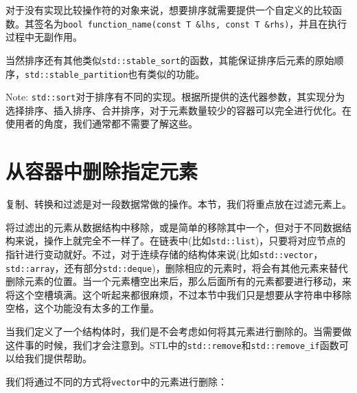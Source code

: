 对于没有实现比较操作符的对象来说，想要排序就需要提供一个自定义的比较函数。其签名为\texttt{bool function\_name(const T \&lhs, const T \&rhs)}，并且在执行过程中无副作用。

当然排序还有其他类似\texttt{std::stable\_sort}的函数，其能保证排序后元素的原始顺序，\texttt{std::stable\_partition}也有类似的功能。

\begin{myInfoBox}
Note: \texttt{std::sort}对于排序有不同的实现。根据所提供的迭代器参数，其实现分为选择排序、插入排序、合并排序，对于元素数量较少的容器可以完全进行优化。在使用者的角度，我们通常都不需要了解这些。
\end{myInfoBox}


\section{从容器中删除指定元素}

复制、转换和过滤是对一段数据常做的操作。本节，我们将重点放在过滤元素上。

将过滤出的元素从数据结构中移除，或是简单的移除其中一个，但对于不同数据结构来说，操作上就完全不一样了。在链表中(比如\texttt{std::list})，只要将对应节点的指针进行变动就好。不过，对于连续存储的结构体来说(比如\texttt{std::vector}，\texttt{std::array}，还有部分\texttt{std::deque})，删除相应的元素时，将会有其他元素来替代删除元素的位置。当一个元素槽空出来后，那么后面所有的元素都要进行移动，来将这个空槽填满。这个听起来都很麻烦，不过本节中我们只是想要从字符串中移除空格，这个功能没有太多的工作量。

当我们定义了一个结构体时，我们是不会考虑如何将其元素进行删除的。当需要做这件事的时候，我们才会注意到。STL中的\texttt{std::remove}和\texttt{std::remove\_if}函数可以给我们提供帮助。


我们将通过不同的方式将\texttt{vector}中的元素进行删除：

